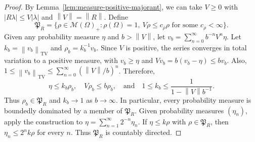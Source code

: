 \documentclass[11pt,leqno]{amsart}
\theoremstyle{compact}
\numberwithin{equation}{section}
\theoremstyle{compactremark}
\theoremstyle{compact}
\newcommand{\1}{\mathbbm{1}}
\newcommand{\norm}[1]{\left\|#1\right\|}
\newcommand{\abs}[1]{\left|#1\right|}
\begin{document}
\begin{proof}
By Lemma~\ref{lem:measure-positive-majorant}, we can take $V\geq0$ with $\abs{R\lambda}\leq V\abs{\lambda}$ and $\norm{V}=\norm{R}$. Define
\[
\mathfrak P_R=\{\rho\in\mathcal M(\Omega)_+:\rho(\Omega)=1,\ V\rho\leq c_\rho\rho\text{ for some }c_\rho<\infty\}.
\]
Given any probability measure $\eta$ and $b>\norm{V}$, let $ v_b=\sum_{n=0}^{\infty}b^{-n}V^n\eta $. Let $k_b=\norm{v_b}_{\mathrm{TV}}$ and $\rho_b=k_b^{-1}v_b$. Since $V$ is positive, the series converges in total variation to a positive measure, with $v_b\geq\eta$ and $Vv_b=b(v_b-\eta)\leq bv_b$. Also, $1\leq\norm{v_b}_{\mathrm{TV}}\leq\sum_{n=0}^{\infty}(\norm{V}/b)^n$. Therefore,
\begin{equation}\label{eq:resolvent-control}
\eta\leq k_b\rho_b,\quad V\rho_b\leq b\rho_b,\quad\text{and}\quad
1\leq k_b\leq\frac{1}{1-\norm{V}b^{-1}}.
\end{equation}
Thus $\rho_b\in\mathfrak P_R$ and $k_b\to1$ as $b\to\infty$. In particular, every probability measure is boundedly dominated by a member of $\mathfrak P_R$. Given probability measures $(\eta_n)$, apply the construction to $\eta=\sum_{n=1}^{\infty}2^{-n}\eta_n$. If $\eta\leq k\rho$ with $\rho\in\mathfrak P_R$, then $\eta_n\leq2^nk\rho$ for every $n$. Thus $\mathfrak P_R$ is countably directed.


\end{proof}
\end{document}
